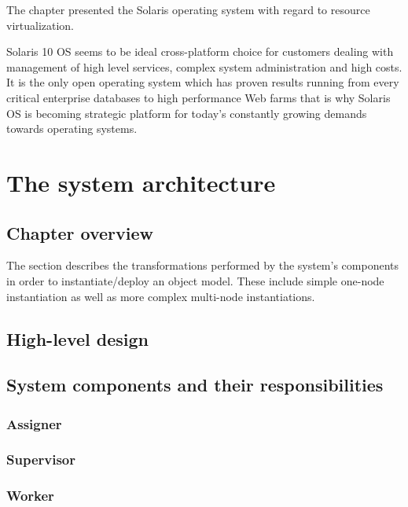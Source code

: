 \documentclass[11pt]{book}
\begin{document}
      The chapter presented the Solaris operating system with regard to resource virtualization.

      Solaris 10 OS seems to be ideal cross-platform choice for customers dealing with management of high level
      services, complex system administration and high costs. It is the only open operating system which has
      proven results running from every critical enterprise databases to high performance Web farms that is
      why Solaris OS is becoming strategic platform for today's constantly growing demands towards operating
      systems. 


  \chapter{The system architecture}

    \section*{Chapter overview}

      The  section describes the transformations performed by the system's components in order
      to instantiate/deploy an object model. These include simple one-node instantiation as well as more complex
      multi-node instantiations.



    \section{High-level design}


    \section{System components and their responsibilities}

      \subsection{Assigner}

      \subsection{Supervisor}

      \subsection{Worker}
\end{document}
